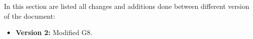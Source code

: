In this section are listed all changes and additions done between different version of the document:
\begin{itemize}
	\item \textbf{Version 2:} Modified G8.
\end{itemize}